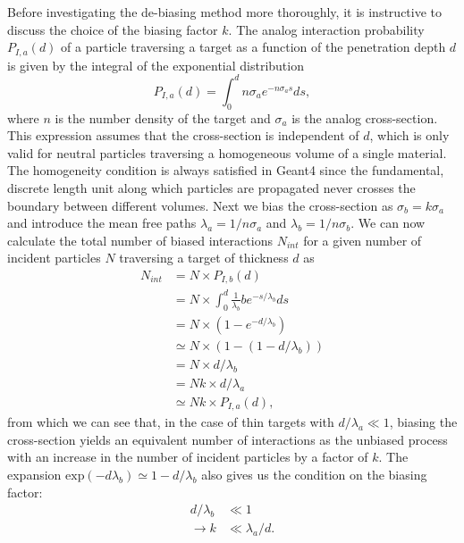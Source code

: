 Before investigating the de-biasing method more thoroughly, it is instructive to discuss the choice of the biasing factor $k$. The analog interaction probability $P_{I,a}(d)$ of a particle traversing a target as a function of the penetration depth $d$ is given by the integral of the exponential distribution
%
\begin{equation}
    P_{I,a}(d) = \int_0^d n\sigma_a e^{-n\sigma_a s}ds,
    \label{eq:analog_pdf}
\end{equation}
%
where $n$ is the number density of the target and $\sigma_a$ is the analog cross-section. This expression assumes that the cross-section is independent of $d$, which is only valid for neutral particles traversing a homogeneous volume of a single material. The homogeneity condition is always satisfied in Geant4 since the fundamental, discrete length unit along which particles are propagated never crosses the boundary between different volumes. Next we bias the cross-section as $\sigma_b = k\sigma_a$ and introduce the mean free paths $\lambda_a = 1 / n \sigma_a$ and $\lambda_b = 1 / n \sigma_b$. We can now calculate the total number of biased interactions $N_{int}$ for a given number of incident particles $N$ traversing a target of thickness $d$ as
%
\begin{equation} \label{eq:n_int}
\begin{split}   
    N_{int} &= N \times P_{I,b}(d)\\
    &= N \times \int_0^d \frac{1}{\lambda_b}b e^{-s/\lambda_b} ds\\
    &= N \times (1-e^{-d/\lambda_b})\\
    &\simeq N \times (1-(1-d/\lambda_b))\\
    &= N \times d/\lambda_b\\
    &= Nk \times d/\lambda_a\\
    &\simeq Nk \times P_{I,a}(d),
\end{split}
\end{equation}
%
from which we can see that, in the case of thin targets with $d / \lambda_a \ll 1$, biasing the cross-section yields an equivalent number of interactions as the unbiased process with an increase in the number of incident particles by a factor of $k$. The expansion $\mathrm{exp}(-d\lambda_b) \simeq 1- d/\lambda_b$ also gives us the condition on the biasing factor:
%
\begin{equation} \label{eq:bias_estimate}
\begin{split}   
d/\lambda_b &\ll 1\\
\rightarrow k &\ll \lambda_a/d.
\end{split}   
\end{equation}
